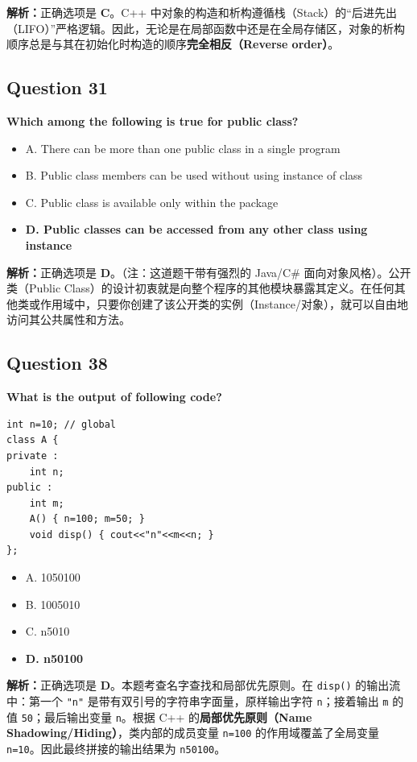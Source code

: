 \documentclass[11pt, a4paper]{article}
\begin{document}
\textbf{解析：}正确选项是 \textbf{C}。C++ 中对象的构造和析构遵循栈（Stack）的“后进先出（LIFO）”严格逻辑。因此，无论是在局部函数中还是在全局存储区，对象的析构顺序总是与其在初始化时构造的顺序\textbf{完全相反（Reverse order）}。


\subsection*{Question 31}
\textbf{Which among the following is true for public class?}
\begin{itemize}
    \item A. There can be more than one public class in a single program
    \item B. Public class members can be used without using instance of class
    \item C. Public class is available only within the package
    \item \textbf{D. Public classes can be accessed from any other class using instance}
\end{itemize}

\textbf{解析：}正确选项是 \textbf{D}。（注：这道题干带有强烈的 Java/C\# 面向对象风格）。公开类（Public Class）的设计初衷就是向整个程序的其他模块暴露其定义。在任何其他类或作用域中，只要你创建了该公开类的实例（Instance/对象），就可以自由地访问其公共属性和方法。


\subsection*{Question 38}
\textbf{What is the output of following code?}
\begin{lstlisting}
int n=10; // global
class A {
private :
    int n;
public :
    int m;
    A() { n=100; m=50; }
    void disp() { cout<<"n"<<m<<n; }
};
\end{lstlisting}
\begin{itemize}
    \item A. 1050100
    \item B. 1005010
    \item C. n5010
    \item \textbf{D. n50100}
\end{itemize}

\textbf{解析：}正确选项是 \textbf{D}。本题考查名字查找和局部优先原则。在 \texttt{disp()} 的输出流中：第一个 \texttt{"n"} 是带有双引号的字符串字面量，原样输出字符 \texttt{n}；接着输出 \texttt{m} 的值 \texttt{50}；最后输出变量 \texttt{n}。根据 C++ 的\textbf{局部优先原则（Name Shadowing/Hiding）}，类内部的成员变量 \texttt{n=100} 的作用域覆盖了全局变量 \texttt{n=10}。因此最终拼接的输出结果为 \texttt{n50100}。
\end{document}
